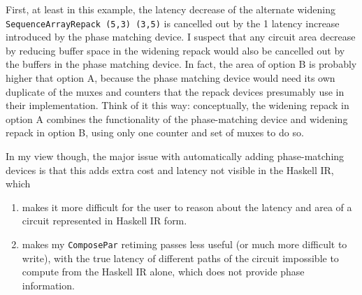 \documentclass[12pt]{article}
\begin{document}
First, at least in this example, the latency decrease of the alternate
widening \texttt{SequenceArrayRepack (5,3) (3,5)} is cancelled out by
the 1 latency increase introduced by the phase matching device.  I
suspect that any circuit area decrease by reducing buffer space in the
widening repack would also be cancelled out by the buffers in the
phase matching device. In fact, the area of option B is probably
higher that option A, because the phase matching device would need its
own duplicate of the muxes and counters that the repack devices
presumably use in their implementation. Think of it this way:
conceptually, the widening repack in option A combines the
functionality of the phase-matching device and widening repack in
option B, using only one counter and set of muxes to do so.

In my view though, the major issue with automatically adding
phase-matching devices is that this adds extra cost and latency not
visible in the Haskell IR, which
\begin{enumerate}
\item makes it more difficult for the user to reason about the latency
and area of a circuit represented in Haskell IR form.

\item makes my \texttt{ComposePar} retiming passes less useful (or much
more difficult to write), with the true latency of different paths of
the circuit impossible to compute from the Haskell IR alone, which does
not provide phase information.
\end{enumerate}
\end{document}
